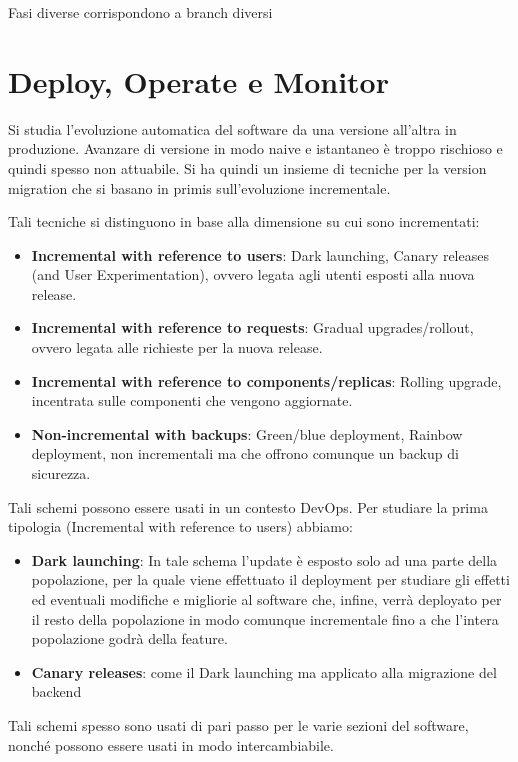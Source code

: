 Fasi diverse corrispondono a branch diversi
\section{Deploy, Operate e Monitor}
Si studia l'evoluzione automatica del software da una versione all'altra in
produzione. Avanzare di versione in modo naive e istantaneo è troppo rischioso e
quindi spesso non attuabile. Si ha quindi un insieme di tecniche per la version
migration che si basano in primis sull'evoluzione incrementale.

Tali tecniche si distinguono in base alla dimensione su cui sono incrementati:
\begin{itemize}
    \item \textbf{Incremental with reference to users}: Dark launching, Canary
          releases (and User Experimentation), ovvero legata agli utenti esposti alla nuova release.
    \item \textbf{Incremental with reference to requests}: Gradual upgrades/rollout,
          ovvero legata alle richieste per la nuova release.
    \item \textbf{Incremental with reference to components/replicas}: Rolling upgrade,
          incentrata sulle componenti che vengono aggiornate.
    \item \textbf{Non-incremental with backups}: Green/blue deployment,
          Rainbow deployment, non incrementali ma che offrono comunque un backup di sicurezza.
\end{itemize}

Tali schemi possono essere usati in un contesto DevOps. Per studiare la prima
tipologia (Incremental with reference to users) abbiamo:
\begin{itemize}
    \item \textbf{Dark launching}: In tale schema l'update è esposto solo ad una
          parte della popolazione, per la quale viene effettuato il deployment per
          studiare gli effetti ed eventuali modifiche e migliorie al software che, infine,
          verrà deployato per il resto della popolazione in modo comunque incrementale
          fino a che l'intera popolazione godrà della feature.
    \item \textbf{Canary releases}: come il Dark launching ma applicato alla migrazione del
          backend 
\end{itemize}

Tali schemi spesso sono usati di pari passo per le varie sezioni del software,
nonché possono essere usati in modo intercambiabile.

